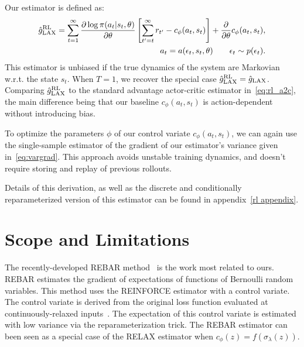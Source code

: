 \documentclass{article}
\newcommand{\LL}[1]{\frac{\partial \log \pi(a_{#1}| s_{#1}, \theta)}{\partial \theta}}
\newcommand{\YW}[1]{{\color{red} \bf [[YW: #1]]}}
\newcommand{\LAX}{{\textnormal{LAX}}}
\newcommand{\RL}{{\textnormal{RL}}}
\begin{document}
Our estimator is defined as: 
%
\begin{align}
\hat g_\LAX^{\RL} = \sum_{t=1}^{\infty} \LL{t} \left[ \sum_{t'=t}^{\infty} r_{t'} - c_\phi(a_t,s_t) \right] +\frac{\partial}{\partial\theta} c_\phi(a_t, s_t), \\
a_t = a(\epsilon_t,s_t, \theta) \qquad \epsilon_t \sim p(\epsilon_t)\nonumber.
\label{eq:rl_est}
\end{align}
%
This estimator is unbiased if the true dynamics of the system are Markovian w.r.t. the state $s_t$.
When $T = 1$, we recover the special case ${\hat g_\LAX^{\RL} = \hat g_\LAX}$.
Comparing $\hat g_\LAX^{\RL}$ to the standard advantage actor-critic estimator in~\eqref{eq:rl_a2c}, the main difference being that our baseline $c_\phi(a_t, s_t)$ is action-dependent without introducing bias.

To optimize the parameters $\phi$ of our control variate $c_\phi(a_t, s_t)$, we can again use the single-sample estimator of the gradient of our estimator's variance given in~\eqref{eq:vargrad}.
This approach avoids unstable training dynamics, and doesn't require storing and replay of previous rollouts.

Details of this derivation, as well as the discrete and conditionally reparameterized version of this estimator can be found in appendix~\ref{rl appendix}.

\section{Scope and Limitations}
\label{limitations}
The recently-developed REBAR method~\citep{tucker2017rebar} is the work most related to ours.
REBAR estimates the gradient of expectations of functions of Bernoulli random variables.
This method uses the REINFORCE estimator with a control variate.
The control variate is derived from the original loss function evaluated at continuously-relaxed inputs~\citep{maddison2016concrete, jang2016categorical}.
The expectation of this control variate is estimated with low variance via the reparameterization trick.
The REBAR estimator can been seen as a special case of the RELAX estimator when ${c_\phi(z) = f(\sigma_\lambda(z))}$.
\end{document}
